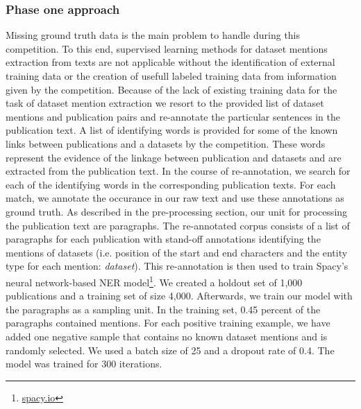 \subsubsection{Phase one approach}
Missing ground truth data is the main problem to handle during this competition.
To this end, supervised learning methods for dataset mentions extraction from texts are not applicable without the identification of external training data or the creation of usefull labeled training data from information given by the competition.
Because of the lack of existing training data for the task of dataset mention extraction we resort to the provided list of dataset mentions and publication pairs and re-annotate the particular sentences in the publication text.
A list of identifying words is provided for some of the known links between publications and a datasets by the competition.
These words represent the evidence of the linkage between publication and datasets and are extracted from the publication text.
In the course of re-annotation, we search for each of the identifying words in the corresponding publication texts.
For each match, we annotate the occurance in our raw text and use these annotations as ground truth.
As described in the pre-processing section, our unit for processing the publication text are paragraphs.
The re-annotated corpus consists of a list of paragraphs for each publication with stand-off annotations identifying the mentions of datasets (i.e. position of the start and end characters and the entity type for each mention: \emph{dataset}).
This re-annotation is then used to train Spacy's neural network-based NER model\footnote{\url{spacy.io}}.
We created a holdout set of 1,000 publications and a training set of size 4,000.
Afterwards, we train our model with the paragraphs as a sampling unit.
In the training set, 0.45 percent of the paragraphs contained mentions.
For each positive training example, we have added one negative sample that contains no known dataset mentions and is randomly selected.   
We used a batch size of 25 and a dropout rate of 0.4.
The model was trained for 300 iterations.
